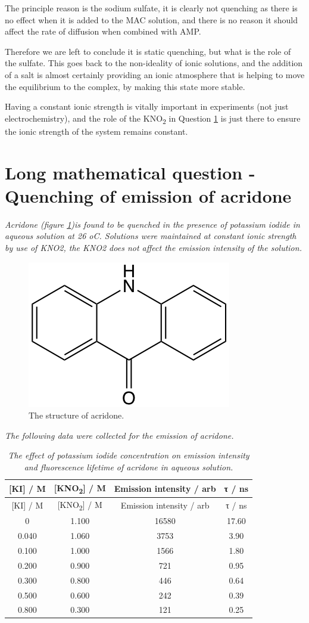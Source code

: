 \documentclass[
]{book}
\begin{document}
The principle reason is the sodium sulfate, it is clearly not quenching as there is no effect when it is added to the MAC solution, and there is no reason it should affect the rate of diffusion when combined with AMP.

Therefore we are left to conclude it is static quenching, but what is the role of the sulfate. This goes back to the non-ideality of ionic solutions, and the addition of a salt is almost certainly providing an ionic atmosphere that is helping to move the equilibrium to the complex, by making this state more stable.

Having a constant ionic strength is vitally important in experiments (not just electrochemistry), and the role of the KNO\textsubscript{2} in Question \ref{sec:acridone} is just there to ensure the ionic strength of the system remains constant.

\hypertarget{sec:acridone}{%
\section{Long mathematical question - Quenching of emission of acridone}\label{sec:acridone}}

\emph{Acridone (figure \ref{fig:acridone})is found to be quenched in the presence of potassium iodide in aqueous solution at 26 oC. Solutions were maintained at constant ionic strength by use of KNO2, the KNO2 does not affect the emission intensity of the solution.}

\begin{figure}

{\centering \includegraphics[width=0.3\linewidth]{images/acridone} 

}

\caption{The structure of acridone.}\label{fig:acridone}
\end{figure}

\emph{The following data were collected for the emission of acridone.}

\begin{longtable}[]{@{}cccc@{}}
\caption{\label{tab:acridonequench} \emph{The effect of potassium iodide concentration on emission intensity and fluorescence lifetime of acridone in aqueous solution.}}\tabularnewline
\toprule
{[}KI{]} / M & {[}KNO\textsubscript{2}{]} / M & Emission intensity / arb & τ / ns\tabularnewline
\midrule
\endfirsthead
\toprule
{[}KI{]} / M & {[}KNO\textsubscript{2}{]} / M & Emission intensity / arb & τ / ns\tabularnewline
\midrule
\endhead
0 & 1.100 & 16580 & 17.60\tabularnewline
0.040 & 1.060 & 3753 & 3.90\tabularnewline
0.100 & 1.000 & 1566 & 1.80\tabularnewline
0.200 & 0.900 & 721 & 0.95\tabularnewline
0.300 & 0.800 & 446 & 0.64\tabularnewline
0.500 & 0.600 & 242 & 0.39\tabularnewline
0.800 & 0.300 & 121 & 0.25\tabularnewline
\bottomrule
\end{longtable}
\end{document}
